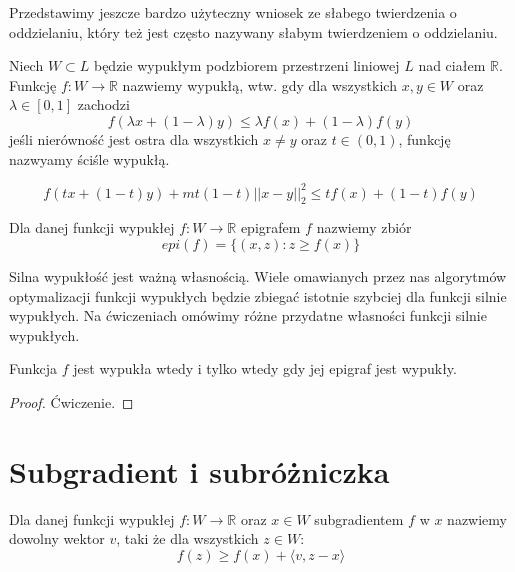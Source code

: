 \documentclass[10pt,a4paper,draft]{report}
\begin{document}
Przedstawimy jeszcze bardzo użyteczny wniosek ze słabego twierdzenia o oddzielaniu, który też jest często nazywany słabym twierdzeniem o oddzielaniu.
\begin{corollary}

\end{corollary}

\begin{definition} 
Niech $W \subset L$ będzie wypukłym podzbiorem przestrzeni liniowej $L$ nad ciałem $\mathbb{R}$. Funkcję $f : W \rightarrow \mathbb{R}$ nazwiemy wypukłą, wtw. gdy dla wszystkich $x,y \in W$ oraz $\lambda \in [0,1]$ zachodzi
\[
f(\lambda x + (1-\lambda)y ) \leq \lambda f(x) + (1 - \lambda) f(y)
\]
jeśli nierówność jest ostra dla wszystkich $x \neq y$ oraz $t \in (0,1)$, funkcję nazwyamy ściśle wypukłą.
\end{definition}

\begin{definition} 
\[
f(tx + (1-t)y) + mt(1-t)||x-y||_2^2 \leq tf(x) + (1-t)f(y) 
\]
\end{definition}

\begin{definition}[Epigraf]
Dla danej funkcji wypukłej $f : W \rightarrow \mathbb{R}$ epigrafem $f$ nazwiemy zbiór
\[
epi (f) = \{ (x,z) : z \geq f(x) \}
\]
\end{definition}

Silna wypukłość jest ważną własnością. Wiele omawianych przez nas algorytmów optymalizacji funkcji wypukłych będzie zbiegać istotnie szybciej dla funkcji silnie wypukłych. Na ćwiczeniach omówimy różne przydatne własności funkcji silnie wypukłych.

\begin{theorem}
Funkcja $f$ jest wypukła wtedy i tylko wtedy gdy jej epigraf jest wypukły.
\end{theorem}
\begin{proof}
Ćwiczenie.
\end{proof}


\section{Subgradient i subróżniczka}

\begin{definition}[Subgradient]
Dla danej funkcji wypukłej $f : W \rightarrow \mathbb{R}$ oraz $x \in W$ subgradientem $f$ w $x$ nazwiemy dowolny wektor $v$, taki że dla wszystkich $z \in W$:
\[
f(z) \geq f(x) + \langle v , z - x \rangle
\]
\end{definition}
\end{document}
